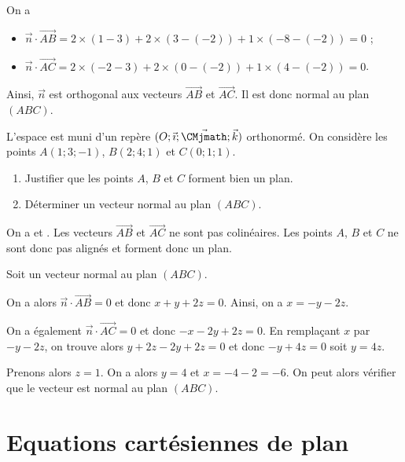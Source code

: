 \documentclass[11pt,fleqn, openany]{book} %
\begin{document}
\begin{solution}On a 
 \begin{itemize}
 \item $\vec n \cdot \overrightarrow{AB} = 2 \times (1-3) + 2 \times (3-(-2))+1 \times (-8-(-2)) = 0$ ;
 \item $\vec n \cdot \overrightarrow{AC} = 2 \times (-2-3) + 2 \times (0-(-2))+1 \times (4-(-2)) = 0$.
 \end{itemize}
 
 Ainsi, $\vec n$ est orthogonal aux vecteurs $\overrightarrow{AB}$ et $\overrightarrow{AC}$. Il est donc normal au plan $(ABC)$.
 \end{solution} 
 
 
 \begin{exercise}L'espace est muni d'un repère $(O;\vec{\imath}; \vec{\CMjmath}; \vec k)$ orthonormé. On considère les points $A(1;3;-1)$, $B(2;4;1)$ et $C(0;1;1)$.
 \begin{enumerate}
 \item Justifier que les points $A$, $B$ et $C$ forment bien un plan.
 \item Déterminer un vecteur normal au plan $(ABC)$.
 \end{enumerate}\end{exercise}
 
\begin{solution}
On a  et . Les vecteurs $\overrightarrow{AB}$ et $\overrightarrow{AC}$ ne sont pas colinéaires. Les points $A$, $B$ et $C$ ne sont donc pas alignés et forment donc un plan.

Soit  un vecteur normal au plan $(ABC)$.

On a alors $\vec n \cdot \overrightarrow{AB}=0$ et donc $x+y+2z=0$. Ainsi, on a $x=-y-2z$.

On a également $\vec n \cdot \overrightarrow{AC}=0$ et donc $-x-2y+2z=0$. En remplaçant $x$ par $-y-2z$, on trouve alors $y+2z-2y+2z=0$ et donc $-y+4z=0$ soit $y=4z$.

Prenons alors $z=1$. On a alors $y=4$ et $x=-4-2=-6$. On peut alors vérifier que le vecteur  est normal au plan $(ABC)$.
\end{solution} 




\section*{Equations cartésiennes de plan}
\end{document}
